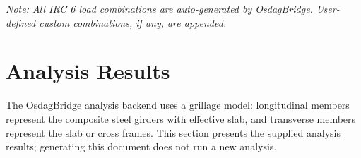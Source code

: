 \documentclass[12pt,a4paper]{report}
\numberwithin{table}{chapter}
\numberwithin{figure}{chapter}
\newcommand{\ReportTableSetup}{%
  \setlength{\tabcolsep}{3.0pt}%
  \renewcommand{\arraystretch}{1.18}%
  \setlength{\arrayrulewidth}{0.4pt}\setlength{\extrarowheight}{0.5pt}%
  \setlength{\LTleft}{\fill}\setlength{\LTright}{\fill}%
  \setlength{\LTpre}{4pt}\setlength{\LTpost}{8pt}}
\newcommand{\ReportTableFont}{\small}
\newcommand{\ReportTableGap}{\vspace{0.5em}}
\begin{document}
\noindent\textit{Note: All IRC 6 load combinations are auto-generated by OsdagBridge. User-defined custom combinations, if any, are appended.}

\setcounter{chapter}{3}
\chapter{Analysis Results}

The OsdagBridge analysis backend uses a grillage model: longitudinal members represent the composite steel girders with effective slab, and transverse members represent the slab or cross frames. This section presents the supplied analysis results; generating this document does not run a new analysis.

\ReportTableGap
\begingroup


\begingroup
\ReportTableSetup
\ReportTableFont
\end{document}
